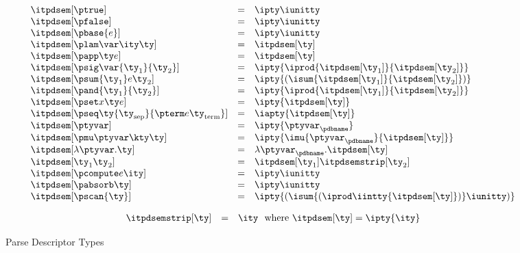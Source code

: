 \begin{figure}
\fbox{$\itpdsem[\ty] = \ity$}
\[ 
\begin{array}{lcl} 
\itpdsem[\ptrue] & = & \ipty \iunitty \\                                                  
\itpdsem[\pfalse] & = & \ipty \iunitty \\                                                  
\itpdsem[\pbase{e}] & = & \ipty \iunitty\\
\itpdsem[\plam \var \ity \ty] & = & \itpdsem[\ty] \\
\itpdsem[\papp \ty e] & = & \itpdsem[\ty] \\
\itpdsem[\psig \var {\ty_1} {\ty_2}] & = & 
               \ipty {\iprod {\itpdsem[\ty_1]} {\itpdsem[\ty_2]}} \\
\itpdsem[\psum {\ty_1} e {\ty_2}] & = & 
               \ipty {(\isum {\itpdsem[\ty_1]} {\itpdsem[\ty_2]})} \\
\itpdsem[\pand {\ty_1} {\ty_2}] & = & \ipty {\iprod {\itpdsem[\ty_1]} {\itpdsem[\ty_2]}}    \\
\itpdsem[\pset x \ty e] & = & \ipty {\itpdsem[\ty]} \\
\itpdsem[\pseq \ty {\ty_{\text{sep}}} {\pterm e {\ty_{\text{term}}}}] & = & 
  \iapty {\itpdsem[\ty]} \\
\itpdsem[\ptyvar] & = & \ipty{\ptyvar_\pdbname} \\
\itpdsem[\pmu \ptyvar \kty \ty] & = & 
  \ipty{\imu{\ptyvar_\pdbname}{\itpdsem[\ty]}} \\
\itpdsem[\lambda \ptyvar.\ty]      
     & = & \lambda \ptyvar_\pdbname.\itpdsem[\ty] \\
\itpdsem[\ty_1 \ty_2]            & = & \itpdsem[\ty_1] \itpdsemstrip[\ty_2] \\
\itpdsem[\pcompute e \ity]            & = & \ipty \iunitty \\
\itpdsem[\pabsorb \ty]                & = & \ipty \iunitty \\
\itpdsem[\pscan{\ty}] & = & \ipty {(\isum {(\iprod \iintty
    {\itpdsem[\ty]})} \iunitty)}
\end{array}
\]

\fbox{$\itpdsemstrip[\ty] = \ity$}

\[
\begin{array}{lcl} 
\itpdsemstrip[\ty] & = & \ity \ \ \mbox{where}\ \itpdsem[\ty] = \ipty{\ity}
\end{array}
\]
\caption{Parse Descriptor Types}
\label{fig:pd-tys}
\end{figure}

